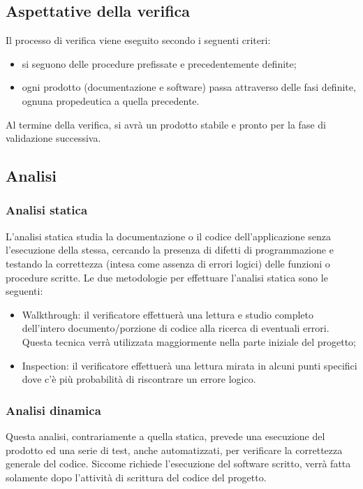\subsection{Aspettative della verifica}
Il processo di verifica viene eseguito secondo i seguenti criteri:
\begin{itemize}
	\item si seguono delle procedure prefissate e precedentemente definite;
	\item ogni prodotto (documentazione e software) passa attraverso delle fasi definite, ognuna propedeutica a quella precedente.
	\end{itemize}
Al termine della verifica, si avrà un prodotto stabile e pronto per la fase di validazione successiva.

\subsection{Analisi}
\subsubsection{Analisi statica}
L’analisi statica studia la documentazione o il codice dell’applicazione senza l’esecuzione della stessa, cercando la presenza di difetti di programmazione e testando la correttezza (intesa come assenza di errori logici) delle funzioni o procedure scritte.
Le due metodologie per effettuare l’analisi statica sono le seguenti:
\begin{itemize}
	\item Walkthrough: il verificatore effettuerà una lettura e studio completo dell’intero documento/porzione di codice alla ricerca di eventuali errori. Questa tecnica verrà utilizzata maggiormente nella parte iniziale del progetto;
	\item Inspection: il verificatore effettuerà una lettura mirata in alcuni punti specifici dove c’è più probabilità di riscontrare un errore logico.
\end{itemize}

\subsubsection{Analisi dinamica}
Questa analisi, contrariamente a quella statica, prevede una esecuzione del prodotto ed una serie di test, anche automatizzati, per verificare la correttezza generale del codice. Siccome richiede l’esecuzione del software scritto, verrà fatta solamente dopo l’attività di scrittura del codice del progetto.

